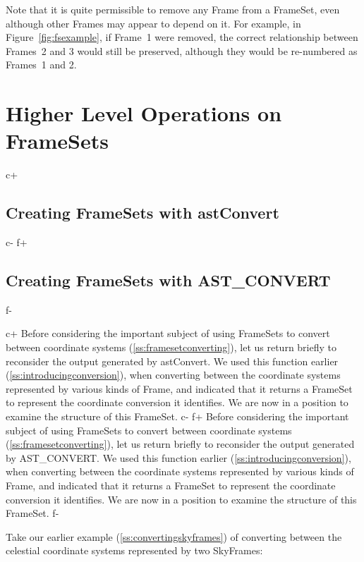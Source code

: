 \documentclass[twoside,11pt]{article}
\newcommand{\secref}[1]{\S\ref{#1}}
\renewcommand{\secref}[1]{\ref{#1}}
\begin{document}
Note that it is quite permissible to remove any Frame from a FrameSet,
even although other Frames may appear to depend on it. For example, in
Figure~\ref{fig:fsexample}, if Frame~1 were removed, the correct
relationship between Frames~2 and 3 would still be preserved, although
they would be re-numbered as Frames~1 and 2.

\cleardoublepage
\section{\label{ss:fshigher}Higher Level Operations on FrameSets}

c+
\subsection{\label{ss:framesetsfromconvert}Creating FrameSets with astConvert}
c-
f+
\subsection{\label{ss:framesetsfromconvert}Creating FrameSets with AST\_CONVERT}
f-

c+
Before considering the important subject of using FrameSets to convert
between coordinate systems (\secref{ss:framesetconverting}), let us
return briefly to reconsider the output generated by astConvert. We
used this function earlier (\secref{ss:introducingconversion}), when
converting between the coordinate systems represented by various kinds
of Frame, and indicated that it returns a FrameSet to represent the
coordinate conversion it identifies. We are now in a position to
examine the structure of this FrameSet.
c-
f+
Before considering the important subject of using FrameSets to convert
between coordinate systems (\secref{ss:framesetconverting}), let us
return briefly to reconsider the output generated by AST\_CONVERT. We
used this function earlier (\secref{ss:introducingconversion}), when
converting between the coordinate systems represented by various kinds
of Frame, and indicated that it returns a FrameSet to represent the
coordinate conversion it identifies. We are now in a position to
examine the structure of this FrameSet.
f-

Take our earlier example (\secref{ss:convertingskyframes}) of
converting between the celestial coordinate systems represented by two
SkyFrames:
\end{document}
